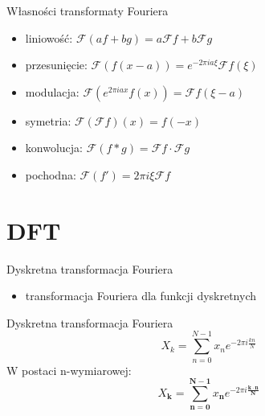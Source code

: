 \documentclass[polish, 12pt, aspectratio=169]{beamer}
\begin{document}
\begin{frame}{Własności transformaty Fouriera}
    \begin{itemize}
        \setlength\itemsep{0.5em}
        \item<2-> liniowość: \( \mathcal{F}(af + bg) = a\mathcal{F}f + b\mathcal{F}g \)
        \item<3-> przesunięcie: \( \mathcal{F}(f(x - a)) = e^{-2\pi i a \xi} \mathcal{F}f(\xi) \)
        \item<3-> modulacja: \( \mathcal{F}(e^{2\pi i a x} f(x)) = \mathcal{F}f(\xi - a) \)
        \item<4-> symetria: \( \mathcal{F}(\mathcal{F}f)(x) = f(-x) \)
        \item<5-> konwolucja: \( \mathcal{F}(f * g) = \mathcal{F}f \cdot \mathcal{F}g \)
        \item<6-> pochodna: \( \mathcal{F}(f') = 2\pi i \xi \mathcal{F}f \)
    \end{itemize}
\end{frame}

\section[DFT \\ {\normalsize Discrete Fourier Transform}]{DFT}

\begin{frame}{Dyskretna transformacja Fouriera}
    \begin{itemize}
        \item transformacja Fouriera dla funkcji dyskretnych
    \end{itemize}
\end{frame}

\begin{frame}{Dyskretna transformacja Fouriera}
    \Huge
    \begin{equation*}
        X_k = \sum_{n=0}^{N-1} x_n e^{-2\pi i \frac{kn}{N}}
    \end{equation*}
    \pause{}
    \small
    W postaci n-wymiarowej:
    \normalsize
    \vspace{-1em}
    \begin{equation*}
        X_{\symbf{k}} = \sum_{\symbf{n} = \symbf{0}}^{\symbf{N} - \symbf{1}} x_{\symbf{n}} e^{-2\pi i \frac{\symbf{k \cdot n}}{\symbf{N}}}
    \end{equation*}
\end{frame}
\end{document}

